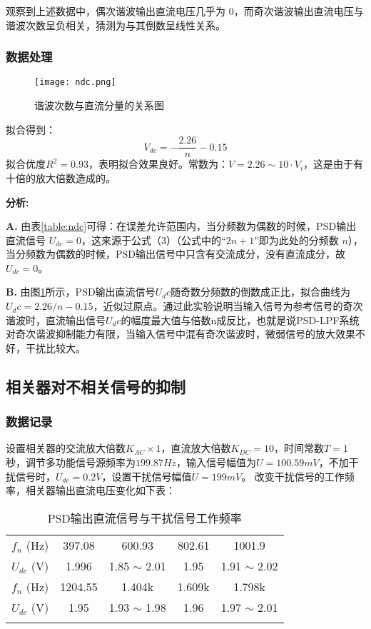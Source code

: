 \documentclass{whureport}
\begin{document}
\begin{multicols}{2}
观察到上述数据中，偶次谐波输出直流电压几乎为 0，而奇次谐波输出直流电压与谐波次数呈负相关，猜测为与其倒数呈线性关系。
\subsubsection{数据处理}
\begin{figure}[H]
	\centering
	\texttt{[image: ndc.png]}
	\caption{谐波次数与直流分量的关系图}
	\label{fig:nfig}
\end{figure}
拟合得到：
\begin{equation}
	V_{dc} = -\frac{2.26}{n} - 0.15
\end{equation}
拟合优度$R^2 = 0.93$，表明拟合效果良好。常数为：$V = 2.26 \sim 10\cdot V_i$，这是由于有十倍的放大倍数造成的。

\textbf{分析:}

\textbf{A.} 由表\ref{table:ndc}可得：在误差允许范围内，当分频数为偶数的时候，PSD输出直流信号 $U_{dc}=0$，这来源于公式（3）（公式中的“$2n+1$”即为此处的分频数 $n$），当分频数为偶数的时候，PSD输出信号中只含有交流成分，没有直流成分，故 $U_{dc}=0$。

\textbf{B.} 由图\ref{fig:nfig}所示，PSD输出直流信号$U_dc$随奇数分频数的倒数成正比，拟合曲线为$U_dc=2.26/n-0.15$，近似过原点。通过此实验说明当输入信号为参考信号的奇次谐波时，直流输出信号$U_dc$的幅度最大值与倍数n成反比，也就是说PSD-LPF系统对奇次谐波抑制能力有限，当输入信号中混有奇次谐波时，微弱信号的放大效果不好，干扰比较大。

\subsection{相关器对不相关信号的抑制}
\subsubsection{数据记录}
设置相关器的交流放大倍数$K_{AC} \times  1$，直流放大倍数$K_{DC} = 10$，时间常数$T = 1$秒，调节多功能信号源频率为$199.87\unit{Hz}$，输入信号幅值为$U=100.59\unit{mV}$，不加干扰信号时，$U_{dc}= 0.2\unit{V}$，设置干扰信号幅值$U=199\unit{mV}$。
改变干扰信号的工作频率，相关器输出直流电压变化如下表：
\begin{table}[H]
    \centering
    \caption{PSD输出直流信号与干扰信号工作频率}
    \small
    \begin{tabular}{ccccc}
        \Xhline{1.0pt}
        $f_n$ (Hz) & 397.08 & 600.93 & 802.61 & 1001.9 \\
        \Xhline{0.5pt}
        $U_{dc}$ (V) & 1.996 & 1.85 $\sim$ 2.01 & 1.95 & 1.91 $\sim$ 2.02 \\
        \Xhline{0.5pt}
        $f_n$ (Hz) & 1204.55 & 1.404k & 1.609k & 1.798k \\
        \Xhline{0.5pt}
        $U_{dc}$ (V) & 1.95 & 1.93 $\sim$ 1.98 & 1.96 & 1.97 $\sim$ 2.01 \\
        \Xhline{1.0pt}
    \end{tabular}
	\label{table:ndc2}
\end{table}

\end{multicols}
\end{document}
